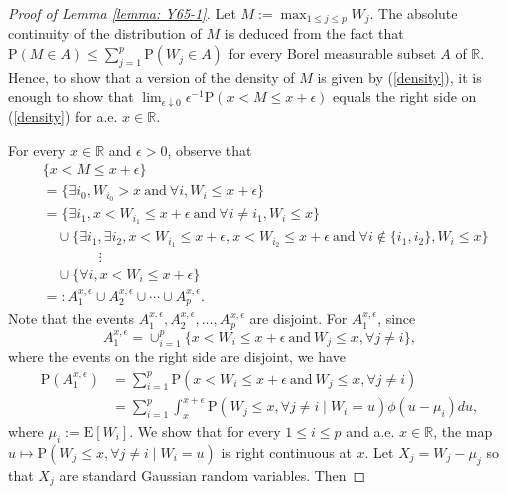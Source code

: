 \documentclass[11pt,reqno]{amsart}
\theoremstyle{definition}
\newcommand{\Ep}{{\mathrm{E}}}
\renewcommand{\Pr}{{\mathrm{P}}}
\newcommand{\RR}{\mathbb{R}}
\begin{document}
\begin{proof}[Proof of Lemma \ref{lemma: Y65-1}]
Let $M := \max_{1 \leq j \leq p} W_{j}$.
The absolute continuity of the distribution of $M$ is deduced from the fact that $\Pr(M \in A) \leq \sum_{j=1}^{p} \Pr(W_{j} \in A)$ for every Borel measurable subset $A$ of $\RR$.
Hence, to show that a version of the density of $M$ is given by (\ref{density}), it is enough to show that $\lim_{\epsilon \downarrow 0} \epsilon^{-1} \Pr(x < M \leq x+\epsilon)$ equals the right side on (\ref{density}) for a.e. $x \in \RR$.

For every $x \in \RR$ and $\epsilon > 0$, observe that
\begin{align*}
& \{ x < M \leq x + \epsilon \} \\
& = \{ \exists i_{0}, W_{i_{0}} > x \ \text{and} \ \forall i,  W_{i} \leq x +\epsilon  \} \\
&= \{ \exists i_{1}, x < W_{i_{1}} \leq x + \epsilon \ \text{and} \ \forall i \neq i_{1}, W_{i} \leq x \} \\
&\quad \cup \{ \exists i_{1}, \exists i_{2}, x < W_{i_{1}} \leq x + \epsilon, x < W_{i_{2}} \leq x + \epsilon \ \text{and} \ \forall i \notin \{ i_{1},i_{2} \},   W_{i} \leq x \} \\
&\qquad \qquad \vdots \\
&\quad \cup \{ \forall i, x < W_{i} \leq x + \epsilon \} \\
&=: A^{x,\epsilon}_{1} \cup A^{x,\epsilon}_{2} \cup \cdots \cup A^{x,\epsilon}_{p}.
\end{align*}
Note that the events $A^{x,\epsilon}_{1},A^{x,\epsilon}_{2},\dots,A^{x,\epsilon}_{p}$ are disjoint. For $A^{x,\epsilon}_{1}$, since
\begin{equation*}
A^{x,\epsilon}_{1} = \cup_{i=1}^{p} \{ x < W_{i} \leq x+\epsilon \ \text{and} \ W_{j} \leq x, \forall j \neq i \},
\end{equation*}
where the events on the right side are disjoint, we have
\begin{align*}
\Pr(A^{x,\epsilon}_{1}) &= \sum_{i=1}^{p} \Pr(x < W_{i} \leq x+\epsilon \ \text{and} \ W_{j} \leq x, \forall j \neq i) \\
&= \sum_{i=1}^{p} \int_{x}^{x+\epsilon} \Pr(W_{j} \leq x, \forall j \neq i \mid W_{i} = u) \phi(u-\mu_{i}) du,
\end{align*}
where $\mu_{i} := \Ep [ W_{i} ]$.
We show that for every $1 \leq i \leq p$ and a.e. $x \in \RR$, the map $u \mapsto \Pr(W_{j} \leq x, \forall j \neq i \mid W_{i} = u)$ is right continuous at $x$.
Let $X_{j}=W_{j}-\mu_{j}$ so that $X_{j}$ are standard Gaussian random variables. Then

\end{proof}
\end{document}
